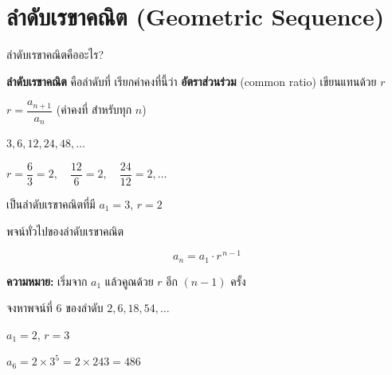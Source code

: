 \documentclass[11pt, aspectratio=169]{beamer}
\begin{document}
\section{ลำดับเรขาคณิต (Geometric Sequence)}

\begin{frame}{ลำดับเรขาคณิตคืออะไร?}
  \begin{explanation}[นิยาม]
    \textbf{ลำดับเรขาคณิต} คือลำดับที่ 
    เรียกค่าคงที่นี้ว่า \textbf{อัตราส่วนร่วม} (common ratio) เขียนแทนด้วย $r$

    \medskip
    $r = \dfrac{a_{n+1}}{a_n}$ \quad (ค่าคงที่ สำหรับทุก $n$)
  \end{explanation}

  \begin{exambox}[ตัวอย่าง]
    $3, 6, 12, 24, 48, \ldots$

    \medskip
    $r = \dfrac{6}{3} = 2, \quad \dfrac{12}{6} = 2, \quad \dfrac{24}{12} = 2, \ldots$

    \medskip
    เป็นลำดับเรขาคณิตที่มี $a_1 = 3$, $r = 2$
  \end{exambox}
\end{frame}

\begin{frame}{พจน์ทั่วไปของลำดับเรขาคณิต}
  \begin{explanation}[สูตรพจน์ที่ $n$]
    \[
      a_n = a_1 \cdot r^{\,n-1}
    \]

    \textbf{ความหมาย:} เริ่มจาก $a_1$ แล้วคูณด้วย $r$ อีก $(n-1)$ ครั้ง
  \end{explanation}

  \begin{exambox}
    จงหาพจน์ที่ 6 ของลำดับ $2, 6, 18, 54, \ldots$

    \medskip
    $a_1 = 2$, $r = 3$

    $a_6 = 2 \times 3^{5} = 2 \times 243 = 486$
  \end{exambox}
\end{frame}

\end{document}
